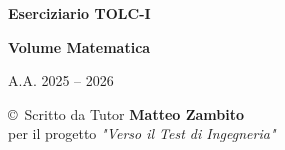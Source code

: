 \documentclass[20pt, a4paper]{article}
\begin{document}
\begin{titlepage}
    \centering
    \vspace*{2cm}
    {\Huge \textbf{Eserciziario TOLC-I} \par}
    \vspace{1cm}
    {\Large \textbf{Volume Matematica} \par}
    \vspace{4cm}
    {\Large A.A. 2025 -- 2026 \par}
    \vspace{4cm}
    \vfill
    {\large \copyright \ Scritto da Tutor \textbf{Matteo Zambito} \\
    per il progetto \textit{"Verso il Test di Ingegneria"} \par}
\end{titlepage}

\newpage
\tableofcontents
\newpage
\end{document}
